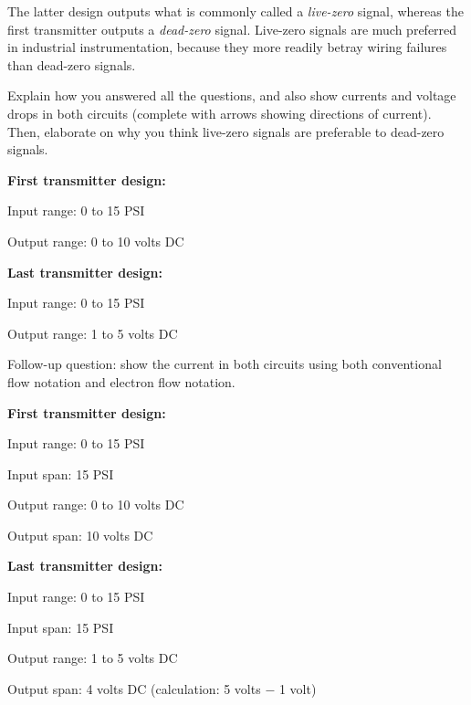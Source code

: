 The latter design outputs what is commonly called a {\it live-zero} signal, whereas the first transmitter outputs a {\it dead-zero} signal.  Live-zero signals are much preferred in industrial instrumentation, because they more readily betray wiring failures than dead-zero signals.

\vskip 10pt

Explain how you answered all the questions, and also show currents and voltage drops in both circuits (complete with arrows showing directions of current).  Then, elaborate on why you think live-zero signals are preferable to dead-zero signals.







\noindent
{\bf First transmitter design:}

Input range: 0 to 15 PSI

Output range: 0 to 10 volts DC

\vskip 10pt

\noindent
{\bf Last transmitter design:}

Input range: 0 to 15 PSI

Output range: 1 to 5 volts DC

\vskip 10pt

Follow-up question: show the current in both circuits using both conventional flow notation and electron flow notation.







\noindent
{\bf First transmitter design:}

Input range: 0 to 15 PSI

Input span: 15 PSI

Output range: 0 to 10 volts DC

Output span: 10 volts DC

\vskip 10pt

\noindent
{\bf Last transmitter design:}

Input range: 0 to 15 PSI

Input span: 15 PSI

Output range: 1 to 5 volts DC

Output span: 4 volts DC (calculation: 5 volts $-$ 1 volt)

\vskip 10pt


